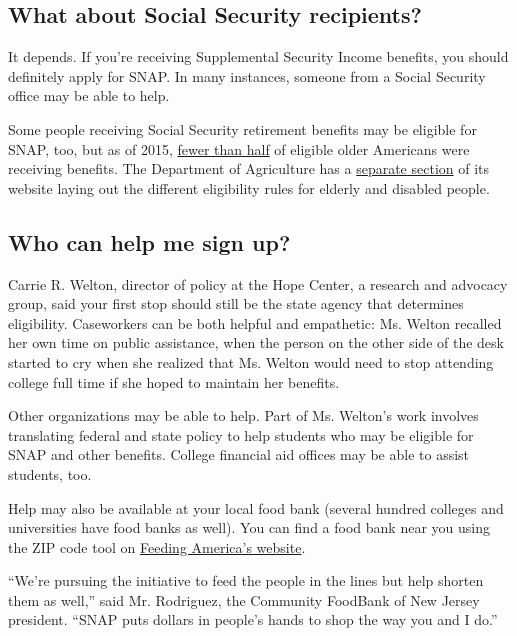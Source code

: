 \hypertarget{what-about-social-security-recipients}{%
\subsection{What about Social Security
recipients?}\label{what-about-social-security-recipients}}

It depends. If you're receiving Supplemental Security Income benefits,
you should definitely apply for SNAP. In many instances, someone from a
Social Security office may be able to help.

Some people receiving Social Security retirement benefits may be
eligible for SNAP, too, but as of 2015,
\href{https://www.fns.usda.gov/pressrelease/2015/020215}{fewer than
half} of eligible older Americans were receiving benefits. The
Department of Agriculture has a
\href{https://www.fns.usda.gov/snap/eligibility/elderly-disabled-special-rules}{separate
section} of its website laying out the different eligibility rules for
elderly and disabled people.

\hypertarget{who-can-help-me-sign-up}{%
\subsection{Who can help me sign up?}\label{who-can-help-me-sign-up}}

Carrie R. Welton, director of policy at the Hope Center, a research and
advocacy group, said your first stop should still be the state agency
that determines eligibility. Caseworkers can be both helpful and
empathetic: Ms. Welton recalled her own time on public assistance, when
the person on the other side of the desk started to cry when she
realized that Ms. Welton would need to stop attending college full time
if she hoped to maintain her benefits.

Other organizations may be able to help. Part of Ms. Welton's work
involves translating federal and state policy to help students who may
be eligible for SNAP and other benefits. College financial aid offices
may be able to assist students, too.

Help may also be available at your local food bank (several hundred
colleges and universities have food banks as well). You can find a food
bank near you using the ZIP code tool on
\href{https://www.feedingamerica.org/find-your-local-foodbank}{Feeding
America's website}.

``We're pursuing the initiative to feed the people in the lines but help
shorten them as well,'' said Mr. Rodriguez, the Community FoodBank of
New Jersey president. ``SNAP puts dollars in people's hands to shop the
way you and I do.''

